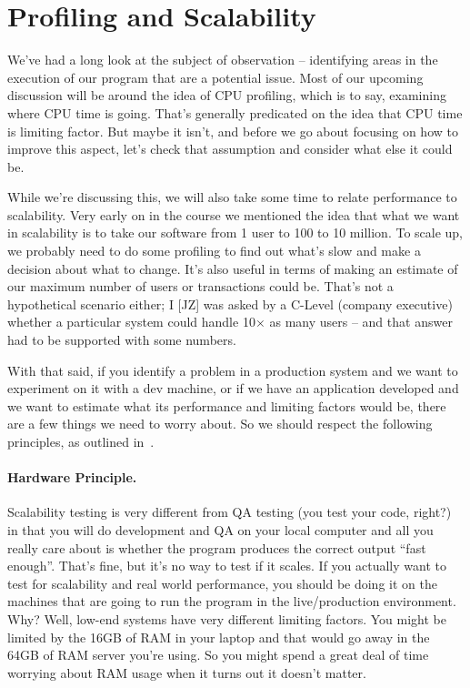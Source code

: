 \documentclass[a4paper]{report}
\begin{document}

\section*{Profiling and Scalability}

We've had a long look at the subject of observation -- identifying areas in the execution of our program that are a potential issue. Most of our upcoming discussion will be around the idea of CPU profiling, which is to say, examining where CPU time is going. That's generally predicated on the idea that CPU time is limiting factor. But maybe it isn't, and before we go about focusing on how to improve this aspect, let's check that assumption and consider what else it could be.

While we're discussing this, we will also take some time to relate performance to scalability. Very early on in the course we mentioned the idea that what we want in scalability is to take our software from 1 user to 100 to 10 million. To scale up, we probably need to do some profiling to find out what's slow and make a decision about what to change. It's also useful in terms of making an estimate of our maximum number of users or transactions could be. That's not a hypothetical scenario either; I [JZ] was asked by a C-Level (company executive) whether a particular system could handle 10$\times$ as many users -- and that answer had to be supported with some numbers.

With that said, if you identify a problem in a production system and we want to experiment on it with a dev machine, or if we have an application developed and we want to estimate what its performance and limiting factors would be, there are a few things we need to worry about.  So we should respect the following principles, as outlined in~\cite{swps}.

\paragraph{Hardware Principle.} 
Scalability testing is very different from  QA testing (you test your code, right?) in that you will do development and QA on your local computer and all you really care about is whether the program produces the correct output ``fast enough''. That's fine, but it's no way to test if it scales. If you actually want to test for scalability and real world performance, you should be doing it on the machines that are going to run the program in the live/production environment. Why? Well, low-end systems have very different limiting factors. You might be limited by the 16GB of RAM in your laptop and that would go away in the 64GB of RAM server you're using. So you might spend a great deal of time worrying about RAM usage when it turns out it doesn't matter.
\end{document}
